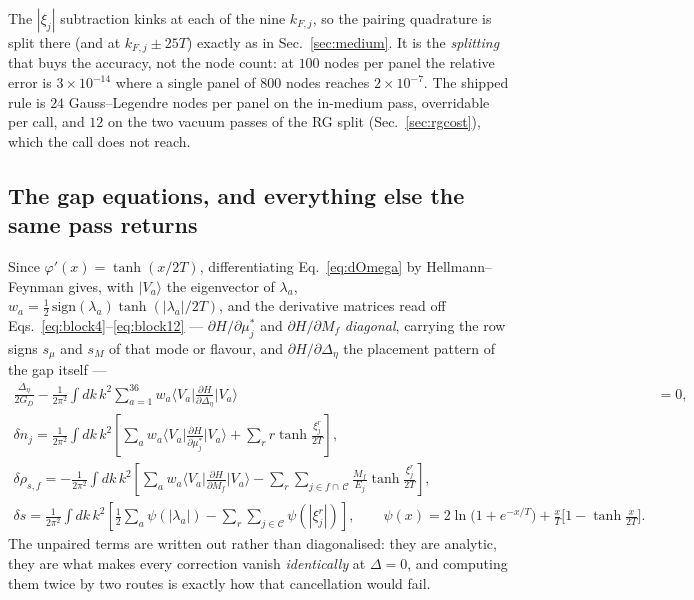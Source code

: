\documentclass[aps,prc,onecolumn,superscriptaddress,nofootinbib,10pt]{revtex4-2}
\newcommand{\GD}{G_D}
\begin{document}
The $|\xi_j|$ subtraction kinks at each of the nine $k_{F,j}$, so the pairing
quadrature is split there (and at $k_{F,j}\pm 25T$) exactly as in
Sec.~\ref{sec:medium}. It is the \emph{splitting} that buys the accuracy, not
the node count: at $100$ nodes per panel the relative error is
$3\times10^{-14}$ where a single panel of $800$ nodes reaches
$2\times10^{-7}$. The shipped rule is $24$ Gauss--Legendre nodes per panel on
the in-medium pass, overridable per call, and $12$ on the two vacuum passes of
the RG split (Sec.~\ref{sec:rgcost}), which the call does not reach.

\subsection{The gap equations, and everything else the same pass returns}
\label{sec:kernels}

Since $\varphi'(x) = \tanh(x/2T)$, differentiating Eq.~\eqref{eq:dOmega} by
Hellmann--Feynman gives, with $|V_a\rangle$ the eigenvector of $\lambda_a$,
$w_a = \tfrac12\,\mathrm{sign}(\lambda_a)\tanh(|\lambda_a|/2T)$, and the
derivative matrices read off Eqs.~\eqref{eq:block4}--\eqref{eq:block12} ---
$\partial H/\partial\mu^{*}_j$ and $\partial H/\partial M_f$ \emph{diagonal},
carrying the row signs $s_\mu$ and $s_M$ of that mode or flavour, and
$\partial H/\partial\Delta_\eta$ the placement pattern of the gap itself ---
\begin{align}
  \frac{\Delta_\eta}{2\GD}
  - \frac{1}{2\pi^2}\int\!\! dk\, k^2 \sum_{a=1}^{36} w_a
    \Big\langle V_a \Big| \frac{\partial H}{\partial \Delta_\eta}
    \Big| V_a \Big\rangle &= 0 ,
  \label{eq:gapeq}\\
  \delta n_j = \frac{1}{2\pi^2}\int\!\! dk\, k^2
    \left[ \sum_{a} w_a
      \Big\langle V_a \Big| \frac{\partial H}{\partial \mu^{*}_j}
      \Big| V_a \Big\rangle
      + \sum_{r} r \tanh\!\frac{\xi^r_j}{2T}\right] ,
  \label{eq:dn}\\
  \delta\rho_{s,f} = -\frac{1}{2\pi^2}\int\!\! dk\, k^2
    \left[\sum_{a} w_a
      \Big\langle V_a \Big| \frac{\partial H}{\partial M_f}
      \Big| V_a \Big\rangle
      - \sum_{r}\sum_{j \in f \cap\, \mathcal C}
        \frac{M_f}{E_j}\tanh\!\frac{\xi^r_j}{2T}\right] ,
  \label{eq:drhos}\\
  \delta s = \frac{1}{2\pi^2}\int\!\! dk\, k^2
    \left[\frac12\sum_{a} \psi(|\lambda_a|)
    - \sum_{r}\sum_{j\in\mathcal C} \psi(|\xi^r_j|)\right] ,
  \qquad
  \psi(x) = 2\ln\!\big(1+e^{-x/T}\big)
            + \frac{x}{T}\Big[1 - \tanh\frac{x}{2T}\Big] .
  \label{eq:ds}
\end{align}
The unpaired terms are written out rather than diagonalised: they are
analytic, they are what makes every correction vanish \emph{identically} at
$\Delta = 0$, and computing them twice by two routes is exactly how that
cancellation would fail.
\end{document}
